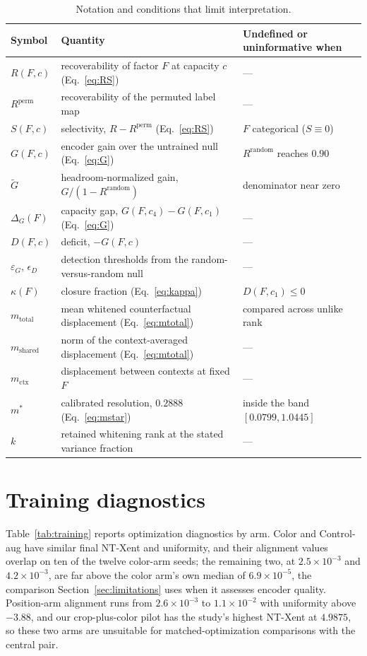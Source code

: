 \documentclass[10pt]{article}
\newcommand{\R}{R}
\newcommand{\Sel}{S}
\newcommand{\G}{G}
\newcommand{\epsG}{\varepsilon_G}
\begin{document}
\begin{table}[tb]
\centering
\caption{Notation and conditions that limit interpretation.}
\label{tab:notation}
\small
\begin{tabular}{l l l}
\toprule
Symbol & Quantity & Undefined or uninformative when \\
\midrule
$\R(F,c)$ & recoverability of factor $F$ at capacity $c$ (Eq.~\ref{eq:RS}) & --- \\
$\R^{\mathrm{perm}}$ & recoverability of the permuted label map & --- \\
$\Sel(F,c)$ & selectivity, $\R - \R^{\mathrm{perm}}$ (Eq.~\ref{eq:RS}) & $F$ categorical ($\Sel \equiv 0$) \\
$\G(F,c)$ & encoder gain over the untrained null (Eq.~\ref{eq:G}) & $\R^{\mathrm{random}}$ reaches $0.90$ \\
$\tilde{\G}$ & headroom-normalized gain, $\G/(1-\R^{\mathrm{random}})$ & denominator near zero \\
$\Delta_{\G}(F)$ & capacity gap, $\G(F,c_4) - \G(F,c_1)$ (Eq.~\ref{eq:G}) & --- \\
$D(F,c)$ & deficit, $-\G(F,c)$ & --- \\
$\epsG$, $\epsilon_D$ & detection thresholds from the random-versus-random null & --- \\
$\kappa(F)$ & closure fraction (Eq.~\ref{eq:kappa}) & $D(F,c_1) \le 0$ \\
$m_{\mathrm{total}}$ & mean whitened counterfactual displacement (Eq.~\ref{eq:mtotal}) & compared across unlike rank \\
$m_{\mathrm{shared}}$ & norm of the context-averaged displacement (Eq.~\ref{eq:mtotal}) & --- \\
$m_{\mathrm{ctx}}$ & displacement between contexts at fixed $F$ & --- \\
$m^{*}$ & calibrated resolution, $0.2888$ (Eq.~\ref{eq:mstar}) & inside the band $[0.0799, 1.0445]$ \\
$k$ & retained whitening rank at the stated variance fraction & --- \\
\bottomrule
\end{tabular}
\end{table}

\section{Training diagnostics}
\label{app:training}
Table~\ref{tab:training} reports optimization diagnostics by arm. Color and Control-aug have
similar final NT-Xent and uniformity, and their alignment values overlap on ten of the twelve
color-arm seeds; the remaining two, at $2.5\times10^{-3}$ and $4.2\times10^{-3}$, are far above
the color arm's own median of $6.9\times10^{-5}$, the comparison Section~\ref{sec:limitations} uses
when it assesses encoder quality. Position-arm alignment runs from $2.6\times10^{-3}$ to
$1.1\times10^{-2}$ with uniformity above $-3.88$, and our crop-plus-color pilot has the study's
highest NT-Xent at $4.9875$, so these two arms are unsuitable for matched-optimization
comparisons with the central pair.
\end{document}
